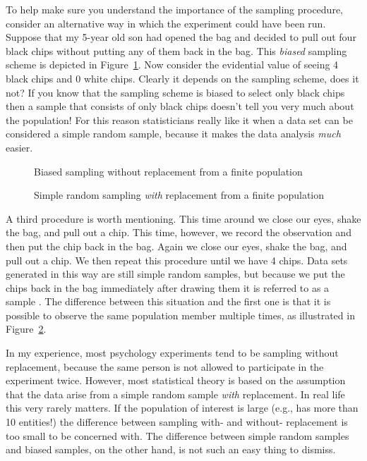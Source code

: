 To help make sure you understand the importance of the sampling procedure, consider an alternative way in which the experiment could have been run. Suppose that my 5-year old son had opened the bag and decided to pull out four black chips without putting any of them back in the bag. This {\it biased} sampling scheme is depicted in Figure~\ref{fig:brs}. Now consider the evidential value of seeing 4 black chips and 0 white chips. Clearly it depends on the sampling scheme, does it not? If you know that the sampling scheme is biased to select only black chips then a sample that consists of only black chips doesn't tell you very much about the population! For this reason statisticians really like it when a data set can be considered a simple random sample, because it makes the data analysis {\it much} easier.  

\begin{figure}[t]
\begin{center}
\end{center}
\caption{Biased sampling without replacement from a finite population}
\label{fig:brs}
\HR
\end{figure}

\begin{figure}[t]
\begin{center}
\end{center}
\caption{Simple random sampling {\it with} replacement from a finite population}
\label{fig:srs2}
\HR
\end{figure}

A third procedure is worth mentioning. This time around we close our eyes, shake the bag, and pull out a chip. This time, however, we record the observation and then put the chip back in the bag. Again we close our eyes, shake the bag, and pull out a chip. We then repeat this procedure until we have 4 chips. Data sets generated in this way are still simple random samples, but because we put the chips back in the bag immediately after drawing them it is referred to as a sample . The difference between this situation and the first one is that it is possible to observe the same population member multiple times, as illustrated in Figure~\ref{fig:srs2}. 

In my experience, most psychology experiments tend to be sampling without replacement, because the same person is not allowed to participate in the experiment twice. However, most statistical theory is based on the assumption that the data arise from a simple random sample {\it with} replacement. In real life this very rarely matters. If the population of interest is large (e.g., has more than 10 entities!) the difference between sampling with- and without- replacement is too small to be concerned with. The difference between simple random samples and biased samples, on the other hand, is not such an easy thing to dismiss.

